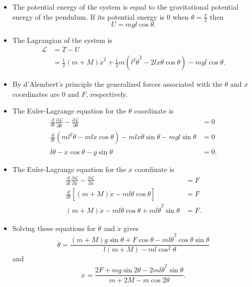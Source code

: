\documentclass{article}
\begin{document}
\begin{itemize}
  \item The potential energy of the system is equal to the gravitational potential energy of the pendulum. If its potential energy is $0$ when $\theta = \frac{\pi}{2}$ then \[U = m g l \cos \theta.\]

  \item The Lagrangian of the system is \begin{align*}
          \mathcal{L} & = T - U                                                                                                                          \\
                      & = \frac{1}{2} (m + M) \dot{x}^2 + \frac{1}{2} m (l^2 \dot{\theta}^2 - 2 l \dot{x} \dot{\theta} \cos \theta) - m g l \cos \theta.
        \end{align*}

  \item By d'Alembert's principle the generalized forces associated with the $\theta$ and $x$ coordinates are $0$ and $F$, respectively.

  \item The Euler-Lagrange equation for the $\theta$ coordinate is \begin{align*}
          \frac{d}{d t} \frac{\partial \mathcal{L}}{\partial \dot{\theta}} - \frac{\partial \mathcal{L}}{\partial \theta}         & = 0  \\
          \frac{d}{d t} (m l^2 \dot{\theta} - m l \dot{x} \cos \theta) - m l \dot{x} \dot{\theta} \sin \theta - m g l \sin \theta & = 0  \\
          l \ddot{\theta} - \ddot{x} \cos \theta - g \sin \theta                                                                  & = 0.
        \end{align*}

  \item The Euler-Lagrange equation for the $x$ coordinate is \begin{align*}
          \frac{d}{d t} \frac{\partial \mathcal{L}}{\partial \dot{x}} - \frac{\partial \mathcal{L}}{\partial x} & = F  \\
          \frac{d}{d t} [(m + M) \dot{x} - m l \dot{\theta} \cos \theta]                                        & = F  \\
          (m + M) \ddot{x} - m l \ddot{\theta} \cos \theta + m l \dot{\theta}^2 \sin \theta                     & = F.
        \end{align*}

  \item Solving these equations for $\ddot{\theta}$ and $\ddot{x}$ gives \[\ddot{\theta} = \frac{(m + M) g \sin \theta + F \cos \theta - m l \dot{\theta}^2 \cos \theta \sin \theta}{l (m + M) - m l \cos^2 \theta}\] and \[\ddot{x} = \frac{2 F + m g \sin 2 \theta - 2 m l \dot{\theta}^2 \sin \theta}{m + 2 M - m \cos 2 \theta}.\]
\end{itemize}
\end{document}
